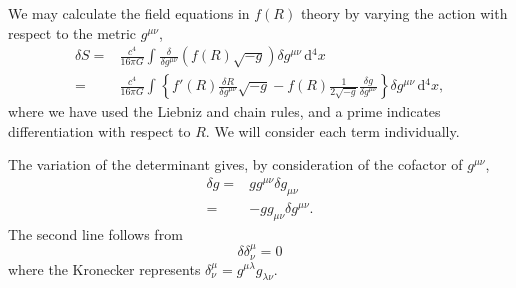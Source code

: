 \documentclass[a4paper, 11pt, titlepage, twoside]{report}
\newcommand{\dd}{\ensuremath{\mathrm{d}}}
\newcommand{\intd}[4]{\ensuremath{\int_{#1}^{#2}{#3}\,\dd{#4}}}
\begin{document}
We may calculate the field equations in $f(R)$ theory by varying the action with respect to the metric $g^{\mu\nu}$,
\begin{align}
\delta S = {} & \frac{c^4}{16\pi G}\intd{}{}{\frac{\delta}{\delta g^{\mu\nu}}(f(R)\sqrt{-g})\delta g^{\mu\nu}}{^4x}\nonumber \\
 = {} & \frac{c^4}{16\pi G}\intd{}{}{\left\{f'(R)\frac{\delta R}{\delta g^{\mu\nu}}\sqrt{-g} - f(R)\frac{1}{2\sqrt{-g}}\frac{\delta g}{\delta g^{\mu\nu}}\right\}\delta g^{\mu\nu}}{^4x},
\label{eq:delta_S}
\end{align}
where we have used the Liebniz and chain rules, and a prime indicates differentiation with respect to $R$. We will consider each term individually.

The variation of the determinant gives, by consideration of the cofactor of $g^{\mu\nu}$,
\begin{align}
\delta g = {} & gg^{\mu\nu}\delta g_{\mu\nu}\nonumber \\
 = {} & -gg_{\mu\nu}\delta g^{\mu\nu}.
 \label{eq:delta g}
\end{align}
The second line follows from
\begin{equation}
\delta \delta^\mu_\nu = 0
\end{equation}
where the Kronecker represents $\delta^\mu_\nu = g^{\mu\lambda}g_{\lambda\nu}$.
\end{document}
